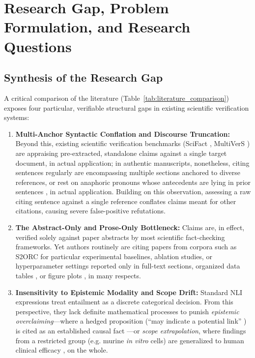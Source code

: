 \documentclass[journal]{IEEEtran}
\begin{document}
\section{Research Gap, Problem Formulation, and Research Questions}
\label{sec:gap_problem}

\subsection{Synthesis of the Research Gap}
A critical comparison of the literature (Table~\ref{tab:literature_comparison}) exposes four particular, verifiable structural gaps in existing scientific verification systems:
\begin{enumerate}
\item \textbf{Multi-Anchor Syntactic Conflation and Discourse Truncation:} Beyond this, existing scientific verification benchmarks (SciFact \cite{wadden2020fact}, MultiVerS \cite{wadden2022multivers}) are appraising pre-extracted, standalone claims against a single target document, in actual application; in authentic manuscripts, nonetheless, citing sentences regularly are encompassing multiple sections anchored to diverse references, or rest on anaphoric pronouns whose antecedents are lying in prior sentences \cite{jurgens2018measuring,kamoi2023wice}, in actual application. Building on this observation, assessing a raw citing sentence against a single reference conflates claims meant for other citations, causing severe false-positive refutations.
\item \textbf{The Abstract-Only and Prose-Only Bottleneck:} Claims are, in effect, verified solely against paper abstracts \cite{wadden2020fact,jin2019pubmedqa} by most scientific fact-checking frameworks. Yet authors routinely are citing papers from corpora such as S2ORC \cite{lo2020s2orc} for particular experimental baselines, ablation studies, or hyperparameter settings reported only in full-text sections, organized data tables \cite{herzig2020tapas,lu2023scitab}, or figure plots \cite{akhtar2023reading}, in many respects.
\item \textbf{Insensitivity to Epistemic Modality and Scope Drift:} Standard NLI expressions \cite{williams2018broad,thorne2018fever} treat entailment as a discrete categorical decision. From this perspective, they lack definite mathematical processes to punish \emph{epistemic overclaiming}---where a hedged proposition (``may indicate a potential link'' \cite{hyland1998hedging}) is cited as an established causal fact \cite{greenberg2009citation}---or \emph{scope extrapolation}, where findings from a restricted group (e.g. murine \emph{in vitro} cells) are generalized to human clinical efficacy \cite{begley2012raise,mogull2017accuracy}, on the whole.

\end{enumerate}
\end{document}
